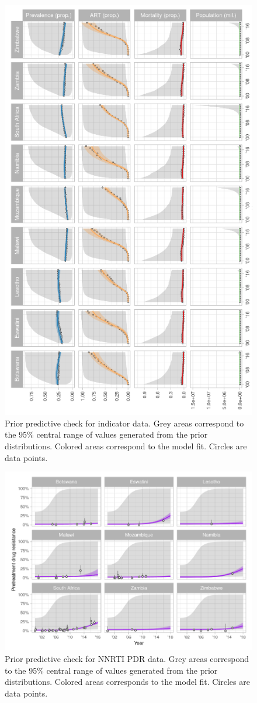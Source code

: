 \documentclass{article}
\begin{document}
	\begin{figure}[h]
		\centering
		\includegraphics[width=.8\linewidth]{prior_predictive_check_indicators.png}
		\caption{Prior predictive check for indicator data. Grey areas correspond to the 95\% central range of values generated from the prior distributions. Colored areas correspond to the model fit. Circles are data points.}
		\label{fig:ppc1}
	\end{figure}
	
	\begin{figure}[h]
		\centering
		\includegraphics[width=.9\linewidth]{prior_predictive_check_pdr.png}
		\caption{Prior predictive check for NNRTI PDR data. Grey areas correspond to the 95\% central range of values generated from the prior distributions. Colored areas corresponds to the model fit. Circles are data points.}
		\label{fig:ppc2}
	\end{figure}
	
\end{document}

